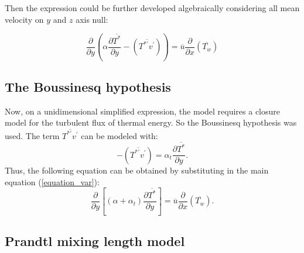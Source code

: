 \documentclass[10pt]{article} %
\begin{document}
Then the expression could be further developed algebraically considering all mean velocity on $y$ and $z$ axis null:

\begin{equation}\label{equation_var}
{\frac{\partial{}}{\partial{y}}} \left(\alpha {\frac{\partial{\overline{T^\ast}}}{\partial{y}}}   
- \left(\overline{ T^{\ast\prime} v^\prime}\right) \right)
= 
\overline{u}\frac{\partial{}}{\partial{x}}\left(\overline{T_w}\right)  
\end{equation}



\subsection{The Boussinesq hypothesis}

Now, on a unidimensional simplified expression, the model requires a closure model for the turbulent flux of thermal energy. So the Boussinesq hypothesis was used. The term $\overline{T^{\ast\prime}  v^\prime}$ can be modeled with:
\begin{equation}\label{bou}
-\left(\overline{ T^{\ast\prime}  v^\prime}\right) = 
\alpha_t \frac{\partial{\overline{T^\ast}}}{\partial{y}}.
\end{equation}
Thus, the following equation can be obtained by substituting in the main equation (\ref{equation_var}):
\\
\begin{equation}
{\frac{\partial{}}{\partial{y}}} \left[(\alpha + \alpha_t)  \frac{\partial \overline{T^\ast}}{\partial y} \right]
= 
\overline{u}\frac{\partial{}}{\partial{x}}\left(\overline{T_w}\right) . 
\end{equation}

\subsection{Prandtl mixing length model} 
\end{document}
